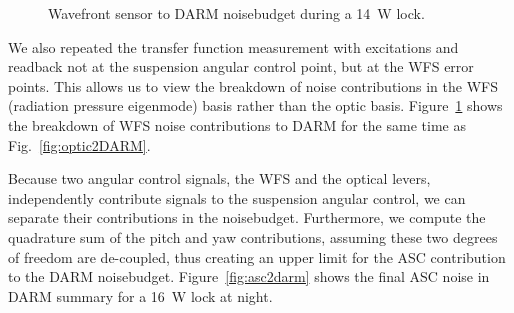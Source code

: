 \begin{figure}
\begin{centering}
\caption[Wavefront sensor to DARM noisebudget]{Wavefront sensor to
  DARM noisebudget during a 14~W lock.} %
\label{fig:wfs2DARM}
\end{centering}
\end{figure}

We also repeated the transfer function measurement with excitations
and readback not at the suspension angular control point, but at the
WFS error points. This allows us to view the breakdown of noise
contributions in the WFS (radiation pressure eigenmode) basis rather
than the optic basis. Figure~\ref{fig:wfs2DARM} shows the breakdown of
WFS noise contributions to DARM for the same time as
Fig.~\ref{fig:optic2DARM}.

Because two angular control signals, the WFS and the optical levers,
independently contribute signals to the suspension angular control, we
can separate their contributions in the noisebudget. Furthermore, we
compute the quadrature sum of the pitch and yaw contributions,
assuming these two degrees of freedom are de-coupled, thus creating an
upper limit for the ASC contribution to the DARM
noisebudget. Figure~\ref{fig:asc2darm} shows the final ASC noise in
DARM summary for a 16~W lock at night.


